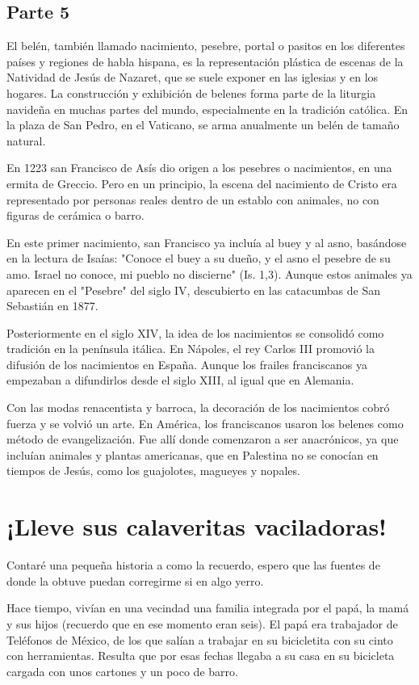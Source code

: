 \section{Parte 5}
El belén, también llamado nacimiento, pesebre, portal o pasitos en los diferentes países y regiones de habla hispana, es la representación plástica de escenas de la Natividad de Jesús de Nazaret, que se suele exponer en las iglesias y en los hogares. La construcción y exhibición de belenes forma parte de la liturgia navideña en muchas partes del mundo, especialmente en la tradición católica. En la plaza de San Pedro, en el Vaticano, se arma anualmente un belén de tamaño natural.

En 1223 san Francisco de Asís dio origen a los pesebres o nacimientos, en una ermita de Greccio. Pero en un principio, la escena del nacimiento de Cristo era representado por personas reales dentro de un establo con animales, no con figuras de cerámica o barro.

En este primer nacimiento, san Francisco ya incluía al buey y al asno, basándose en la lectura de Isaías: "Conoce el buey a su dueño, y el asno el pesebre de su amo. Israel no conoce, mi pueblo no discierne" (Is. 1,3). Aunque estos animales ya aparecen en el "Pesebre" del siglo IV, descubierto en las catacumbas de San Sebastián en 1877.

Posteriormente en el siglo XIV, la idea de los nacimientos se consolidó como tradición en la península itálica. En Nápoles, el rey Carlos III promovió la difusión de los nacimientos en España. Aunque los frailes franciscanos ya empezaban a difundirlos desde el siglo XIII, al igual que en Alemania.

Con las modas renacentista y barroca, la decoración de los nacimientos cobró fuerza y se volvió un arte. En América, los franciscanos usaron los belenes como método de evangelización. Fue allí donde comenzaron a ser anacrónicos, ya que incluían animales y plantas americanas, que en Palestina no se conocían en tiempos de Jesús, como los guajolotes, magueyes y nopales.

\chapter{¡Lleve sus calaveritas vaciladoras!}
Contaré una pequeña historia a como la recuerdo, espero que las fuentes de donde la obtuve puedan corregirme si en algo yerro.

Hace tiempo, vivían en una vecindad una familia integrada por el papá, la mamá y sus hijos (recuerdo que en ese momento eran seis). El papá era trabajador de Teléfonos de México, de los que salían a trabajar en su bicicletita con su cinto con herramientas. Resulta que por esas fechas llegaba a su casa en su bicicleta cargada con unos cartones y un poco de barro.

